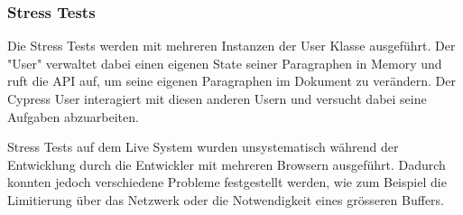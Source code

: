 \subsubsection{Stress Tests}
Die Stress Tests werden mit mehreren Instanzen der User Klasse ausgef\"uhrt.
Der "User" verwaltet dabei einen eigenen State seiner Paragraphen in Memory und ruft die API auf, um seine eigenen Paragraphen im Dokument zu ver\"andern.
Der Cypress User interagiert mit diesen anderen Usern und versucht dabei seine Aufgaben abzuarbeiten.

Stress Tests auf dem Live System wurden unsystematisch w\"ahrend der Entwicklung durch die Entwickler mit mehreren Browsern ausgef\"uhrt.
Dadurch konnten jedoch verschiedene Probleme festgestellt werden, wie zum Beispiel die Limitierung \"uber das Netzwerk oder die Notwendigkeit eines gr\"osseren Buffers.
